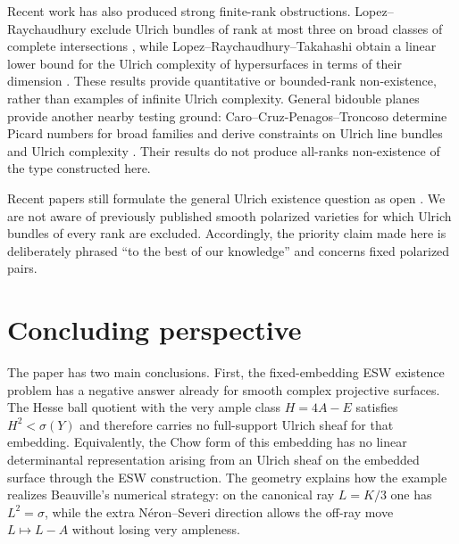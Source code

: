 \documentclass[11pt]{article}
\newcommand{\sig}{\sigma}
\begin{document}
Recent work has also produced strong finite-rank obstructions.
Lopez--Raychaudhury exclude Ulrich bundles of rank at most three on broad classes
of complete intersections \cite{LopezRaychaudhury2026}, while
Lopez--Raychaudhury--Takahashi obtain a linear lower bound for the Ulrich
complexity of hypersurfaces in terms of their dimension
\cite{LopezRaychaudhuryTakahashi2026}.  These results provide quantitative or
bounded-rank non-existence, rather than examples of infinite Ulrich complexity.
General bidouble planes provide another nearby testing ground:
Caro--Cruz-Penagos--Troncoso determine Picard numbers for broad families and derive
constraints on Ulrich line bundles and Ulrich complexity
\cite{CaroCruzPenagosTroncoso}.  Their results do not produce all-ranks
non-existence of the type constructed here.

Recent papers still formulate the general Ulrich existence question as open
\cite{MiroRoig2026,Bordoni2025}.  We are not aware of previously published
smooth polarized varieties for which Ulrich bundles of every rank are excluded.
Accordingly, the priority claim made here is deliberately phrased ``to the best
of our knowledge'' and concerns fixed polarized pairs.

\section{Concluding perspective}

The paper has two main conclusions.  First, the fixed-embedding ESW existence
problem has a negative answer already for smooth complex projective surfaces.  The
Hesse ball quotient with the very ample class $H=4A-E$ satisfies
$H^2<\sig(Y)$ and therefore carries no full-support Ulrich sheaf for that embedding.
Equivalently, the Chow form of this embedding has no linear determinantal
representation arising from an Ulrich sheaf on the embedded surface through the ESW construction.  The
geometry explains how the example realizes Beauville's numerical strategy: on the
canonical ray $L=K/3$ one has $L^2=\sig$, while the extra N\'eron--Severi direction
allows the off-ray move $L\mapsto L-A$ without losing very ampleness.
\end{document}
